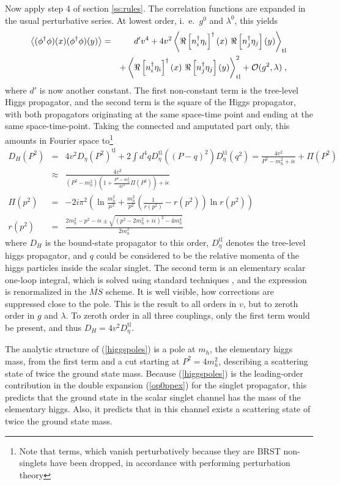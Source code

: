 \documentclass[final,twoside,12pt]{article}
\newcommand*{\no}{\noindent}
\newcommand*{\bea}{\begin{eqnarray}}
\newcommand*{\eea}{\end{eqnarray}}
\newcommand*{\pref}[1]{(\ref{#1})}
\newcommand*{\nn}{\nonumber}
\newcommand*{\tl}{\mathrm{tl}}
\newcommand*{\1}{1\!\!\!\bot}
\newcommand*{\la}{\left\langle}
\newcommand*{\ra}{\right\rangle}
\begin{document}
Now apply step 4 of section \ref{ss:rules}. The correlation functions are expanded in the usual perturbative series. At lowest order, i.\ e.\ $g^0$ and $\lambda^0$, this yields
\bea
\la(\phi^\dagger\phi)(x)(\phi^\dagger\phi)(y)\ra& =& d'v^4+4v^2\la \Re\left[n_i^\dagger\eta_i\right]^\dagger(x)~\Re\left[n_j^\dagger\eta_j\right](y) \ra_\text{tl}\label{op0ppex} \\
&&+\la \Re\left[n_i^\dagger\eta_i\right]^\dagger(x)~\Re\left[n_j^\dagger\eta_j\right](y) \ra_\text{tl}^2+{\cal O}(g^2,\lambda)\nn\;,
\eea
\no where $d'$ is now another constant. The first non-constant term is the tree-level Higgs propagator, and the second term is the square of the Higgs propagator, with both propagators originating at the same space-time point and ending at the same space-time-point. Taking the connected and amputated part only, this amounts in Fourier space to\footnote{Note that terms, which vanish perturbatively because they are BRST non-singlets have been dropped, in accordance with performing perturbation theory}
\bea
D_{H}(P^2)&=&4v^2D_\eta(P^2)^\tl+2\int d^4q D_\eta^\tl((P-q)^2)D_\eta^\tl(q^2)=\frac{4v^2}{P^2-m_h^2+i\epsilon}+\Pi(P^2)\label{higgspoles}\\
&\approx&\frac{4v^2}{\left(P^2-m_h^2\right)\left(1+\frac{P^2-m_h^2}{4v^2}\Pi(P^2)\right)+i\epsilon}\nn\\
\Pi(p^2)&=&-2i\pi^2\left(\ln\frac{m_h^2}{\mu^2}+\frac{m_h^2}{p^2}\left(\frac{1}{r(p^2)}-r(p^2)\right)\ln r(p^2)\right)\nn\\
r(p^2)&=&\frac{2m_h^2-p^2-i\epsilon\pm\sqrt{(p^2-2m_h^2+i\epsilon)^2-4m_h^4}}{2m_h^2}\nn
\eea
\no where $D_H$ is the bound-state propagator to this order, $D_\eta^\tl$ denotes the tree-level higgs propagator, and $q$ could be considered to be the relative momenta of the higgs particles inside the scalar singlet. The second term is an elementary scalar one-loop integral, which is solved using standard techniques \cite{Bohm:2001yx}, and the expression is renormalized in the $\overline{MS}$ scheme. It is well visible, how corrections are suppressed close to the pole. This is the result to all orders in $v$, but to zeroth order in $g$ and $\lambda$. To zeroth order in all three couplings, only the first term would be present, and thus $D_H=4v^2D_\eta^\tl$.

The analytic structure of \pref{higgspoles} is a pole at $m_h$, the elementary higgs mass, from the first term and a cut starting at $P^2=4m_h^2$, describing a scattering state of twice the ground state mass. Because \pref{higgspoles} is the leading-order contribution in the double expansion \pref{op0ppex} for the singlet propagator, this predicts that the ground state in the scalar singlet channel has the mass of the elementary higgs. Also, it predicts that in this channel exists a scattering state of twice the ground state mass.
\end{document}
